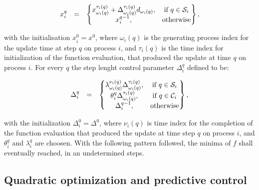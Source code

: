 	\begin{equation}
        \begin{array}{rcl}
            x_i^q&=&\begin{Bmatrix}
                x_{\omega_i(q)}^{\tau_i(q)}+\Delta_{\omega_i(q)}^{\tau_i(q)}d_{\omega_i(q)},&\textnormal{if }q\in\mathcal{S}_i\\
                x_i^{q-1},&\textnormal{otherwise}\\
            \end{Bmatrix},\\
        \end{array}
        \label{BSIC:equ:APPS_x}
    \end{equation}
		
		with the initialisation $x^0_i=x^0$, where $\omega_i(q)$ is the generating process index for the update time at step $q$ on process $i$, and $\tau_i(q)$ is the time index for initialization of the function evaluation, that produced the update at time $q$ on process $i$. For every $q$ the step lenght control parameter $\Delta_i^q$ defined to be:
		
		\begin{equation}
        \begin{array}{rcl}
            \Delta_i^q&=&\begin{Bmatrix}
                \lambda_{\omega_i(q)}^{\nu_i(q)}\Delta_{\omega_i(q)}^{\tau_i(q)},&\textnormal{if }q\in\mathcal{S}_i\\
								\theta_{i}^{q}\Delta_{\omega_i(q)}^{\tau_i(q)},&\textnormal{if }q\in\mathcal{C}_i\\
                \Delta_i^{q-1},&\textnormal{otherwise}\\
            \end{Bmatrix},\\
        \end{array}
        \label{BSIC:equ:APPS_Delta}
    \end{equation}
		
		with the initialization $\Delta^0_i=\Delta^0$, where $\nu_i(q)$ is  time index for the completion of the function evaluation that produced the update at time step $q$ on process $i$, and $\theta_i^q$ and $\lambda_i^q$ are choosen. With the following pattern followed, the minima of $f$ shall eventually reached, in an undetermined steps.

\subsection{Quadratic optimization and predictive control}\label{BASICCSR:sec:MPC}

